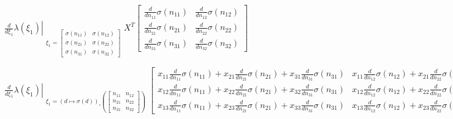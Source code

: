 \documentclass[11pt]{article}
\begin{document}
    
    $\displaystyle \left. \frac{d}{d \xi_{1}} \lambda{\left(\xi_{1} \right)} \right|_{\substack{ \xi_{1}=\left[\begin{matrix}\sigma{\left(n_{11} \right)} & \sigma{\left(n_{12} \right)}\\\sigma{\left(n_{21} \right)} & \sigma{\left(n_{22} \right)}\\\sigma{\left(n_{31} \right)} & \sigma{\left(n_{32} \right)}\end{matrix}\right] }} X^{T} \left[\begin{matrix}\frac{d}{d n_{11}} \sigma{\left(n_{11} \right)} & \frac{d}{d n_{12}} \sigma{\left(n_{12} \right)}\\\frac{d}{d n_{21}} \sigma{\left(n_{21} \right)} & \frac{d}{d n_{22}} \sigma{\left(n_{22} \right)}\\\frac{d}{d n_{31}} \sigma{\left(n_{31} \right)} & \frac{d}{d n_{32}} \sigma{\left(n_{32} \right)}\end{matrix}\right]$

    
    $\displaystyle \left. \frac{d}{d \xi_{1}} \lambda{\left(\xi_{1} \right)} \right|_{\substack{ \xi_{1}={\left( d \mapsto \sigma{\left(d \right)} \right)}_{\circ}\left({\left[\begin{matrix}n_{11} & n_{12}\\n_{21} & n_{22}\\n_{31} & n_{32}\end{matrix}\right]}\right) }} \left[\begin{matrix}x_{11} \frac{d}{d n_{11}} \sigma{\left(n_{11} \right)} + x_{21} \frac{d}{d n_{21}} \sigma{\left(n_{21} \right)} + x_{31} \frac{d}{d n_{31}} \sigma{\left(n_{31} \right)} & x_{11} \frac{d}{d n_{12}} \sigma{\left(n_{12} \right)} + x_{21} \frac{d}{d n_{22}} \sigma{\left(n_{22} \right)} + x_{31} \frac{d}{d n_{32}} \sigma{\left(n_{32} \right)}\\x_{12} \frac{d}{d n_{11}} \sigma{\left(n_{11} \right)} + x_{22} \frac{d}{d n_{21}} \sigma{\left(n_{21} \right)} + x_{32} \frac{d}{d n_{31}} \sigma{\left(n_{31} \right)} & x_{12} \frac{d}{d n_{12}} \sigma{\left(n_{12} \right)} + x_{22} \frac{d}{d n_{22}} \sigma{\left(n_{22} \right)} + x_{32} \frac{d}{d n_{32}} \sigma{\left(n_{32} \right)}\\x_{13} \frac{d}{d n_{11}} \sigma{\left(n_{11} \right)} + x_{23} \frac{d}{d n_{21}} \sigma{\left(n_{21} \right)} + x_{33} \frac{d}{d n_{31}} \sigma{\left(n_{31} \right)} & x_{13} \frac{d}{d n_{12}} \sigma{\left(n_{12} \right)} + x_{23} \frac{d}{d n_{22}} \sigma{\left(n_{22} \right)} + x_{33} \frac{d}{d n_{32}} \sigma{\left(n_{32} \right)}\end{matrix}\right]$
\end{document}
